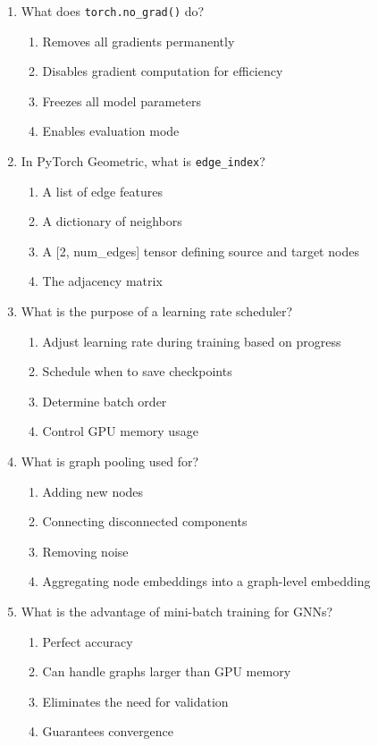 \documentclass[12pt,a4paper]{article}
\begin{document}
\begin{enumerate}
\item What does \texttt{torch.no\_grad()} do?
\begin{enumerate}[label=\Alph*)]
    \item Removes all gradients permanently
    \item Disables gradient computation for efficiency
    \item Freezes all model parameters
    \item Enables evaluation mode
\end{enumerate}

\item In PyTorch Geometric, what is \texttt{edge\_index}?
\begin{enumerate}[label=\Alph*)]
    \item A list of edge features
    \item A dictionary of neighbors
    \item A [2, num\_edges] tensor defining source and target nodes
    \item The adjacency matrix
\end{enumerate}

\item What is the purpose of a learning rate scheduler?
\begin{enumerate}[label=\Alph*)]
    \item Adjust learning rate during training based on progress
    \item Schedule when to save checkpoints
    \item Determine batch order
    \item Control GPU memory usage
\end{enumerate}

\item What is graph pooling used for?
\begin{enumerate}[label=\Alph*)]
    \item Adding new nodes
    \item Connecting disconnected components
    \item Removing noise
    \item Aggregating node embeddings into a graph-level embedding
\end{enumerate}

\item What is the advantage of mini-batch training for GNNs?
\begin{enumerate}[label=\Alph*)]
    \item Perfect accuracy
    \item Can handle graphs larger than GPU memory
    \item Eliminates the need for validation
    \item Guarantees convergence
\end{enumerate}


\end{enumerate}
\end{document}
